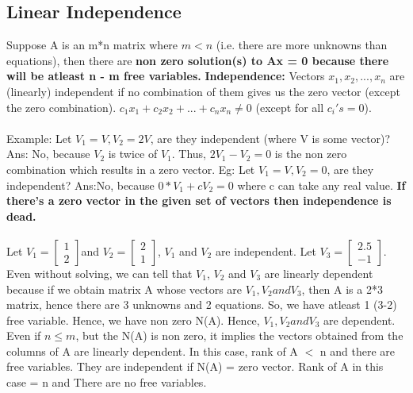 \documentclass{article}
\begin{document}
\subsection{Linear Independence}
Suppose A is an m*n matrix where $m < n$ (i.e. there are more unknowns than equations), then there are \textbf{non zero solution(s) to Ax = 0 because there will be atleast n - m free variables.}
\newline
\textbf{Independence:} Vectors $x_1, x_2, ... , x_n$ are (linearly) independent if no combination of them gives us the zero vector (except the zero combination).
\newline
$c_1x_1 + c_2x_2 + ... + c_nx_n \neq 0$ (except for all $c_i's = 0$).
\\~\\
Example: Let $V_1 = V, V_2 = 2V$, are they independent (where V is some vector)?
Ans: No, because $V_2$ is twice of $V_1$. Thus, $2V_1 - V_2 = 0$ is the non zero combination which results in a zero vector.
\newline
Eg: Let $V_1 = V, V_2 = 0$, are they independent?
Ans:No, because $0*V_1 + cV_2 = 0$ where c can take any real value. 
\textbf{If there's a zero vector in the given set of vectors then independence is dead.}
\\~\\
Let $V_1 =  \begin{bmatrix} 1 \\ 2 \end{bmatrix} $and $V_2 = \begin{bmatrix} 2 \\ 1 \end{bmatrix}$, $V_1$ and $V_2$ are independent. 
\newline
Let $V_3 = \begin{bmatrix} 2.5 \\ -1 \end{bmatrix}$. Even without solving, we can tell that $V_1$, $V_2$ and $V_3$ are linearly dependent because if we obtain matrix A whose vectors are $V_1, V_2 and V_3$, then A is a 2*3 matrix, hence there are 3 unknowns and 2 equations. So, we have atleast 1 (3-2)
free variable. Hence, we have non zero N(A). Hence, $V_1, V_2 and V_3$ are dependent.
\newline 
Even if $n \leq m$, but the N(A) is non zero, it implies the vectors obtained from the columns of A are linearly dependent. In this case, rank of A $<$ n and there are free variables.
\newline
They are independent if N(A) = {zero vector}. Rank of A in this case = n and There are no free variables.
\end{document}
